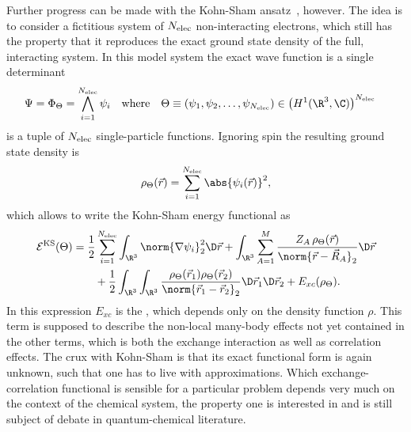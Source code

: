 Further progress can be made with the Kohn-Sham ansatz~\cite{Kohn1965}, however.
The idea is to consider a fictitious system of
$N_\text{elec}$ non-interacting electrons,
which still has the property that it reproduces the exact
ground state density of the full, interacting system.
In this model system the exact wave function is a single determinant
\begin{align*}
	\Psi &= \Phi_\Theta = \bigwedge_{i=1}^{\Nelec} \psi_i
	&&\text{where}&
	\Theta \equiv \left(\psi_1, \psi_2, \ldots, \psi_{\Nelec}\right)
	&\in \left(H^1(\R^3, \C)\right)^{\Nelec}
\end{align*}
is a tuple of $N_\text{elec}$ single-particle functions.
Ignoring spin the resulting ground state density is
\[
	\rho_\Theta(\vec{r}) = \sum_{i=1}^{\Nelec} \abs{\psi_i(\vec{r})}^2,
\]
which allows to write the Kohn-Sham energy functional as
\begin{equation}
	\begin{aligned}
	\mathcal{E}^\text{KS}(\Theta)
	&= \frac12 \sum_{i=1}^{\Nelec} \int_{\R^3} \norm{\nabla \psi_i}_2^2 \D\vec{r}
	+ \int_{\R^3} \sum_{A=1}^M
		\frac{Z_A \, \rho_\Theta(\vec{r})}{\norm{\vec{r} - \vec{R}_A}_2} \D\vec{r} \\
	&\hspace{20pt}
	+ \frac12 \int_{\R^3}\int_{\R^3}
		\frac{\rho_\Theta(\vec{r}_1) \rho_\Theta(\vec{r}_2)}
			{\norm{\vec{r}_1 - \vec{r}_2}_2} \D\vec{r}_1 \D\vec{r}_2
	+ E_{xc}(\rho_\Theta).
	\end{aligned}
	\label{eqn:KSEnergyFunctional}
\end{equation}
In this expression $E_{xc}$ is the ,
which depends only on the density function $\rho$.
This term is supposed to describe the non-local
many-body effects not yet contained in the other terms,
which is both the exchange interaction as well as correlation effects.
The crux with Kohn-Sham \DFT is that its exact functional form is again unknown,
such that one has to live with approximations.
Which exchange-correlation functional is sensible for a particular
problem depends very much on the context of the chemical system,
the property one is interested in and is still subject of debate
in quantum-chemical literature.

